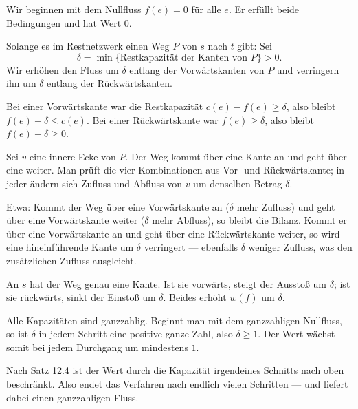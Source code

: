 \begin{merksatz}
Wir beginnen mit dem Nullfluss $f(e) = 0$ für alle $e$. Er erfüllt beide Bedingungen und hat Wert $0$.

Solange es im Restnetzwerk einen Weg $P$ von $s$ nach $t$ gibt: Sei
\[ \delta = \min\{\text{Restkapazität der Kanten von } P\} > 0 . \]
Wir erhöhen den Fluss um $\delta$ entlang der Vorwärtskanten von $P$ und verringern ihn um $\delta$ entlang der Rückwärtskanten.

 Bei einer Vorwärtskante war die Restkapazität $c(e)-f(e) \ge \delta$, also bleibt $f(e)+\delta \le c(e)$. Bei einer Rückwärtskante war $f(e) \ge \delta$, also bleibt $f(e)-\delta \ge 0$.

 Sei $v$ eine innere Ecke von $P$. Der Weg kommt über eine Kante an und geht über eine weiter. Man prüft die vier Kombinationen aus Vor- und Rückwärtskante; in jeder ändern sich Zufluss und Abfluss von $v$ um denselben Betrag $\delta$.

Etwa: Kommt der Weg über eine Vorwärtskante an ($\delta$ mehr Zufluss) und geht über eine Vorwärtskante weiter ($\delta$ mehr Abfluss), so bleibt die Bilanz. Kommt er über eine Vorwärtskante an und geht über eine Rückwärtskante weiter, so wird eine hineinführende Kante um $\delta$ verringert --- ebenfalls $\delta$ weniger Zufluss, was den zusätzlichen Zufluss ausgleicht.

 An $s$ hat der Weg genau eine Kante. Ist sie vorwärts, steigt der Ausstoß um $\delta$; ist sie rückwärts, sinkt der Einstoß um $\delta$. Beides erhöht $w(f)$ um $\delta$.

Alle Kapazitäten sind ganzzahlig. Beginnt man mit dem ganzzahligen Nullfluss, so ist $\delta$ in jedem Schritt eine positive ganze Zahl, also $\delta \ge 1$. Der Wert wächst somit bei jedem Durchgang um mindestens $1$.

Nach Satz 12.4 ist der Wert durch die Kapazität irgendeines Schnitts nach oben beschränkt. Also endet das Verfahren nach endlich vielen Schritten --- und liefert dabei einen ganzzahligen Fluss.
\end{merksatz}

